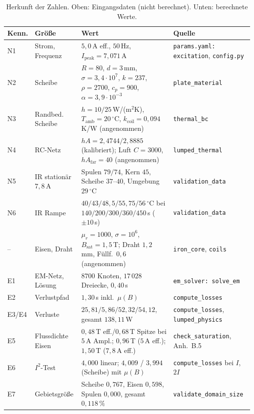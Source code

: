 \documentclass[a4paper, 10pt, conference]{ieeeconf}
\theoremstyle{remark}
\begin{document}
\begin{table}[t]
\centering\footnotesize
\caption{Herkunft der Zahlen. Oben: Eingangsdaten (nicht berechnet). Unten: berechnete Werte.}
\label{tab:provenance}
\begin{tabularx}{\textwidth}{@{}l l X l@{}}
\toprule
Kenn. & Größe & Wert & Quelle \\
\midrule
N1 & Strom, Frequenz & $5{,}0\,$A eff., $50\,$Hz, $I_{\mathrm{peak}}=7{,}071\,$A & \texttt{params.yaml: excitation}, \texttt{config.py} \\
N2 & Scheibe & $R=80$, $d=3\,$mm, $\sigma=3{,}4\cdot10^7$, $k=237$, $\rho=2700$, $c_p=900$, $\alpha=3{,}9\cdot10^{-3}$ & \texttt{plate\_material} \\
N3 & Randbed. Scheibe & $h=10/25\,$W/(m$^2$K), $T_{\mathrm{amb}}=20\,^\circ$C, $k_{\mathrm{coil}}=0{,}094\,$K/W (angenommen) & \texttt{thermal\_bc} \\
N4 & RC-Netz & $hA=2{,}4744/2{,}8885$ (kalibriert); Luft $C=3000$, $hA_{\mathrm{far}}=40$ (angenommen) & \texttt{lumped\_thermal} \\
N5 & IR stationär $7{,}8\,$A & Spulen $79/74$, Kern $45$, Scheibe $37$--$40$, Umgebung $29\,^\circ$C & \texttt{validation\_data} \\
N6 & IR Rampe & $40/43/48{,}5/55{,}75/56\,^\circ$C bei $140/200/300/360/450\,$s ($\pm10\,$s) & \texttt{validation\_data} \\
-- & Eisen, Draht & $\mu_r=1000$, $\sigma=10^6$, $B_{\mathrm{sat}}=1{,}5\,$T; Draht $1{,}2\,$mm, Füllf.\ $0{,}6$ (angenommen) & \texttt{iron\_core}, \texttt{coils} \\
\midrule
E1 & EM-Netz, Lösung & $8700$ Knoten, $17\,028$ Dreiecke, $0{,}40\,$s & \texttt{em\_solver: solve\_em} \\
E2 & Verlustpfad & $1{,}30\,$s inkl.\ $\mu(B)$ & \texttt{compute\_losses} \\
E3/E4 & Verluste & $25{,}81/5{,}86/52{,}32/54{,}12$, gesamt $138{,}11\,$W & \texttt{compute\_losses}, \texttt{lumped\_physics} \\
E5 & Flussdichte Eisen & $0{,}48\,$T eff./$0{,}68\,$T Spitze bei $5\,$A Ampl.; $0{,}96\,$T ($5\,$A eff.); $1{,}50\,$T ($7{,}8\,$A eff.) & \texttt{check\_saturation}, Anh.~B.5 \\
E6 & $I^2$-Test & $4{,}000$ linear; $4{,}009$ / $3{,}994$ (Scheibe) mit $\mu(B)$ & \texttt{compute\_losses} bei $I$, $2I$ \\
E7 & Gebietsgröße & Scheibe $0{,}767$, Eisen $0{,}598$, Spulen $0{,}000$, gesamt $0{,}118\,\%$ & \texttt{validate\_domain\_size} \\

\end{tabularx}
\end{table}
\end{document}

